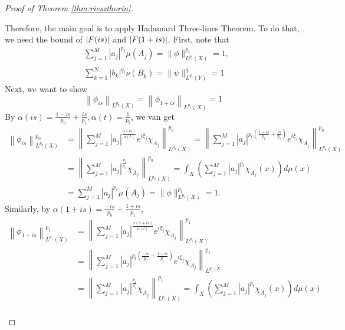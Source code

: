 \begin{proof}[Proof of Theorem \ref{thm:rieszthorin}]
\begin{enumerate}[label=(\Roman*)]
\begin{enumerate}[label=\theenumi-\arabic{*}]
\begin{enumerate}[label=(\roman*)]
				\noindent Therefore, the main goal is to apply Hadamard Three-lines Theorem. To do that, we need the bound of $\left\lvert F(is)\right\lvert$ and $\left\lvert F(1+is)\right\lvert$. First, note that
				\begin{equation*}
					\begin{aligned}
						& \sum_{j=1}^M\left|a_j\right|^{p_t} \mu\left(A_j\right)=\|\phi\|_{L^{p_t}(X)}^{p_t}=1, \\
						& \sum_{k=1}^N\left|b_k\right|^{q_t^{\prime}} \nu\left(B_k\right)=\|\psi\|_{L^{q_t}(Y)}^{q^{\prime}}=1
					\end{aligned}
				\end{equation*}
				Next, we want to show
				\begin{equation*}
					\left\|\phi_{i s}\right\|_{L^{p_0}(X)}=\left\|\phi_{1+i s}\right\|_{L^{p_1}(X)}=1
				\end{equation*}
				By $\alpha(i s)=\frac{1-i s}{p_0}+\frac{i s}{p_1}, \alpha(t)=\frac{1}{p_t}$, we van get
				\begin{equation*}
					\begin{aligned}
						\left\|\phi_{i s}\right\|_{L^{p_0}(X)}^{p_0} & =\left\|\sum_{j=1}^M\left|a_j\right|^{\frac{\alpha(i s)}{\alpha(t)}} e^{i \xi_j} \chi_{A_j}\right\|_{L^{p_0}(X)}^{p_0}=\left\|\sum_{j=1}^M\left|a_j\right|^{p_t\left(\frac{1-i s}{p_0}+\frac{i s}{p_1}\right)} e^{i \xi_j} \chi_{A_j}\right\|_{L^{p_0}(X)}^{p_0} \\
						& =\left\|\sum_{j=1}^M\left|a_j\right|^{\frac{p_t}{p_0}} \chi_{A_j}\right\|_{L^{p_0}(X)}^{p_0}=\int_X\left(\sum_{j=1}^M\left|a_j\right|^{p_t} \chi_{A_j}(x)\right) d \mu(x) \\
						& =\sum_{j=1}^M\left|a_j\right|^{p_t} \mu\left(A_j\right)=\|\phi\|_{L^{p_t}(X)}^{p_t}=1 .
					\end{aligned}
				\end{equation*}
				Similarly, by $\alpha(1+i s)=\frac{-i s}{p_0}+\frac{1+i s}{p_1}$,
				\begin{equation*}
					\begin{aligned}
						\left\|\phi_{1+i s}\right\|_{L^{p_1}(X)}^{p_1} & =\left\|\sum_{j=1}^M\left|a_j\right|^{\frac{\alpha(1+i s)}{\alpha(t)}} e^{i \xi_j} \chi_{A_j}\right\|_{L^{p_1}(X)}^{p_1} \\
						& =\left\|\sum_{j=1}^M\left|a_j\right|^{p_t\left(\frac{-i s}{p_0}+\frac{1+i s}{p_1}\right)} e^{i \xi_j} \chi_{A_j}\right\|_{L^{p_1(X)}}^{p_1} \\
						& =\left\|\sum_{j=1}^M\left|a_j\right|^{\frac{p_t}{p_1}} \chi_{A_j}\right\|_{L^{p_1}(X)}^{p_1}=\int_X\left(\sum_{j=1}^M\left|a_j\right|^{p_t} \chi_{A_j}(x)\right) d \mu(x) \\

\end{aligned}
\end{equation*}
\end{enumerate}
\end{enumerate}
\end{enumerate}
\end{proof}
